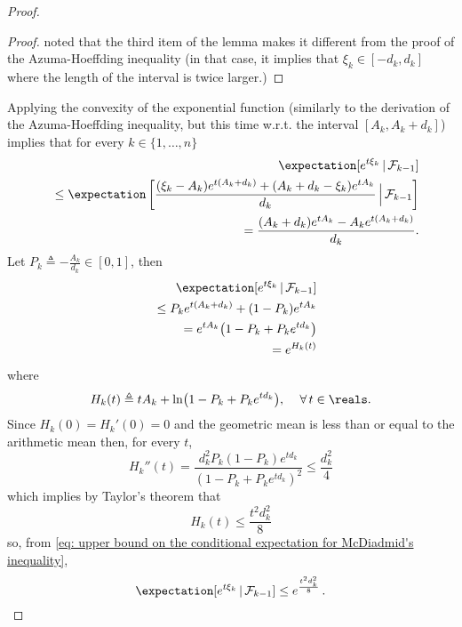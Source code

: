 \documentclass{article}
\theoremstyle{plain}
\begin{document}
\begin{proof}
\begin{proof}
noted that the third item of the lemma makes it different from the
proof of the Azuma-Hoeffding inequality (in that case, it implies that
$\xi_k \in [-d_k, d_k]$ where the length of the interval is twice larger.)
\end{proof}
Applying the convexity of the exponential function (similarly to the derivation
of the Azuma-Hoeffding inequality, but this time w.r.t. the interval $[A_k, A_k+d_k]$)
implies that for every $k \in \{1, \ldots, n\}$
\begin{eqnarray*}
&& \expectation[e^{t \xi_k} \, | \, \mathcal{F}_{k-1}] \\
&& \leq \expectation\left[ \frac{(\xi_k - A_k) e^{t(A_k+d_k)} + (A_k+d_k-\xi_k) e^{t A_k}}{d_k} \,
\Big| \, \mathcal{F}_{k-1}\right] \\
&& = \frac{(A_k+d_k) e^{t A_k} - A_k e^{t (A_k+d_k)}}{d_k}.
\end{eqnarray*}
Let $P_k \triangleq -\frac{A_k}{d_k} \in [0,1]$, then
\begin{eqnarray}
&& \expectation[e^{t \xi_k} \, | \, \mathcal{F}_{k-1}] \nonumber \\
&& \leq P_k e^{t (A_k+d_k)} + (1-P_k) e^{t A_k} \nonumber \\
&& = e^{t A_k} \bigl( 1-P_k + P_k e^{t d_k} \bigr) \nonumber \\
&& = e^{H_k(t)}
\label{eq: upper bound on the conditional expectation for McDiadmid's inequality}
\end{eqnarray}
where
\begin{equation}
H_k(t) \triangleq t A_k + \ln \bigl(1-P_k + P_k e^{t d_k}\bigr), \quad \, \forall \, t \in \reals.
\label{eq: H_k}
\end{equation}
Since $H_k(0) = H_k'(0) = 0$ and the geometric mean is less than or equal to the arithmetic
mean then, for every $t$,
$$H_k''(t) = \frac{d_k^2 P_k (1-P_k) e^{t d_k}}{(1-P_k+P_k e^{t d_k})^2} \leq \frac{d_k^2}{4}$$
which implies by Taylor's theorem that
\begin{equation}
H_k(t) \leq \frac{t^2 d_k^2}{8}
\label{eq: upper bound on H_k used for Hoeffding inequality}
\end{equation}
so, from \eqref{eq: upper bound on the conditional expectation for McDiadmid's inequality},
\begin{equation*}
\expectation[e^{t \xi_k} \, | \, \mathcal{F}_{k-1}] \leq e^{\frac{t^2 d_k^2}{8}} \, .

\end{equation*}
\end{proof}
\end{document}
